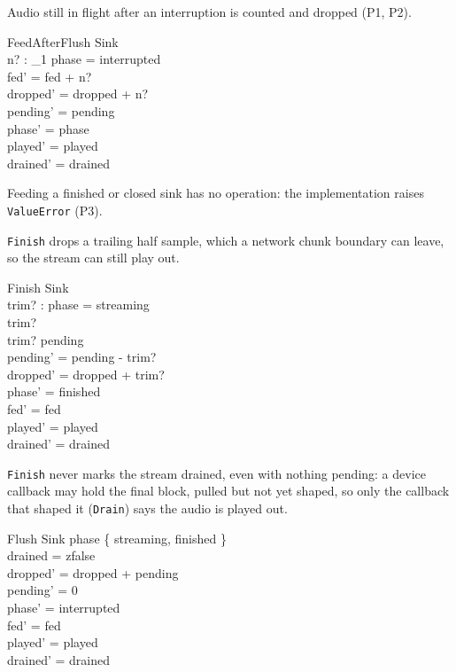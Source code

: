 \documentclass[a4paper,10pt,fleqn]{article}
\begin{document}
Audio still in flight after an interruption is counted and dropped (P1, P2).

\begin{schema}{FeedAfterFlush}
  \Delta Sink \\
  n? : \nat_1
\where
  phase = interrupted \\
  fed' = fed + n? \\
  dropped' = dropped + n? \\
  pending' = pending \\
  phase' = phase \\
  played' = played \\
  drained' = drained
\end{schema}

Feeding a finished or closed sink has no operation: the implementation raises
\texttt{ValueError} (P3).

\texttt{Finish} drops a trailing half sample, which a network chunk boundary
can leave, so the stream can still play out.

\begin{schema}{Finish}
  \Delta Sink \\
  trim? : \nat
\where
  phase = streaming \\
  trim?  \\
  trim? \leq pending \\
  pending' = pending - trim? \\
  dropped' = dropped + trim? \\
  phase' = finished \\
  fed' = fed \\
  played' = played \\
  drained' = drained
\end{schema}

\texttt{Finish} never marks the stream drained, even with nothing pending: a
device callback may hold the final block, pulled but not yet shaped, so only
the callback that shaped it (\texttt{Drain}) says the audio is played out.

\begin{schema}{Flush}
  \Delta Sink
\where
  phase \in \{ streaming, finished \} \\
  drained = zfalse \\
  dropped' = dropped + pending \\
  pending' = 0 \\
  phase' = interrupted \\
  fed' = fed \\
  played' = played \\
  drained' = drained
\end{schema}
\end{document}
